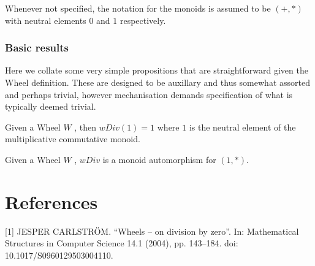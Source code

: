 Whenever not specified, the notation for the monoids is assumed to be $(+,*)$ with neutral elements $0$ and $1$ respectively.
\subsection{Basic results}
Here we collate some very simple propositions that are straightforward given the Wheel definition. These are designed to be auxillary 
and thus somewhat assorted and perhaps trivial, however mechanisation demands specification of what is typically deemed trivial.
\begin{proposition}
\label{prop:wDiv_one}
\leanok
Given a Wheel $W$ , then $wDiv(1) = 1$  where $1$ is the neutral element of the multiplicative commutative monoid.
\end{proposition}
\begin{proposition}
\label{prop:wDivMonAuto}
\leanok
Given a Wheel $W$ ,  $wDiv$ is a monoid automorphism for $(1,*)$.
\end{proposition}
\chapter{References}
[1] JESPER CARLSTRÖM. “Wheels – on division by zero”. In: Mathematical Structures in Computer Science 14.1 (2004), pp. 143–184. doi: 10.1017/S0960129503004110.